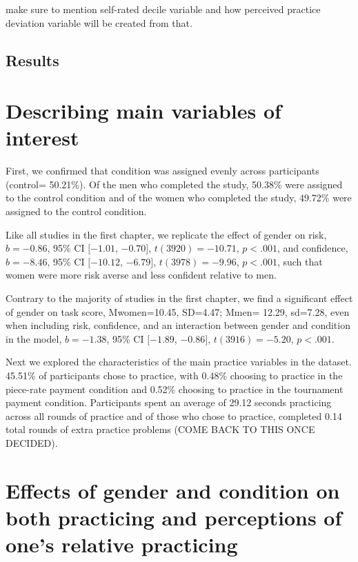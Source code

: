 \documentclass[a4paper, nobind]{templates/ociamthesis}
\begin{document}
make sure to mention self-rated decile variable and how perceived practice deviation variable will be created from that.

\hypertarget{results-3}{%
\subsection{Results}\label{results-3}}

\hypertarget{describing-main-variables-of-interest}{%
\section{Describing main variables of interest}\label{describing-main-variables-of-interest}}

First, we confirmed that condition was assigned evenly across participants (control= 50.21\%). Of the men who completed the study, 50.38\% were assigned to the control condition and of the women who completed the study, 49.72\% were assigned to the control condition.

Like all studies in the first chapter, we replicate the effect of gender on risk, \(b = -0.86\), 95\% CI \([-1.01\), \(-0.70]\), \(t(3920) = -10.71\), \(p < .001\), and confidence, \(b = -8.46\), 95\% CI \([-10.12\), \(-6.79]\), \(t(3978) = -9.96\), \(p < .001\), such that women were more risk averse and less confident relative to men.

Contrary to the majority of studies in the first chapter, we find a significant effect of gender on task score, Mwomen=10.45, SD=4.47; Mmen= 12.29, sd=7.28, even when including risk, confidence, and an interaction between gender and condition in the model, \(b = -1.38\), 95\% CI \([-1.89\), \(-0.86]\), \(t(3916) = -5.20\), \(p < .001\).

Next we explored the characteristics of the main practice variables in the dataset. 45.51\% of participants chose to practice, with 0.48\% choosing to practice in the piece-rate payment condition and 0.52\% choosing to practice in the tournament payment condition. Participants spent an average of 29.12 seconds practicing across all rounds of practice and of those who chose to practice, completed 0.14 total rounds of extra practice problems (COME BACK TO THIS ONCE DECIDED).

\hypertarget{effects-of-gender-and-condition-on-both-practicing-and-perceptions-of-ones-relative-practicing}{%
\section{Effects of gender and condition on both practicing and perceptions of one's relative practicing}\label{effects-of-gender-and-condition-on-both-practicing-and-perceptions-of-ones-relative-practicing}}
\end{document}

